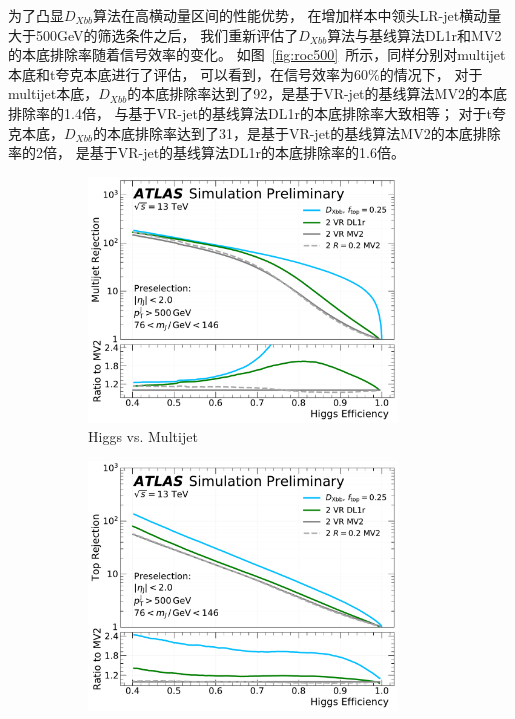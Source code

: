 为了凸显$D_{Xbb}$算法在高横动量区间的性能优势，
在增加样本中领头LR-jet横动量大于500GeV的筛选条件之后，
我们重新评估了$D_{Xbb}$算法与基线算法DL1r和MV2的本底排除率随着信号效率的变化。
如图~\ref{fig:roc500}~所示，同样分别对multijet本底和t夸克本底进行了评估，
可以看到，在信号效率为$60\%$的情况下，
对于multijet本底，$D_{Xbb}$的本底排除率达到了92，是基于VR-jet的基线算法MV2的本底排除率的1.4倍，
与基于VR-jet的基线算法DL1r的本底排除率大致相等；
对于t夸克本底，$D_{Xbb}$的本底排除率达到了31，是基于VR-jet的基线算法MV2的本底排除率的2倍，
是基于VR-jet的基线算法DL1r的本底排除率的1.6倍。


\begin{figure}[!thbp]
  \begin{subfigure}{.5\textwidth}
  \centering
  \includegraphics[width=0.9\textwidth]{figuresXbb/pulled/roc/500_inf/zoom/dijet.pdf}
  \caption{Higgs vs. Multijet}
  \end{subfigure}
  \begin{subfigure}{.5\textwidth}
  \centering
  \includegraphics[width=0.9\textwidth]{figuresXbb/pulled/roc/500_inf/top.pdf}

\end{subfigure}
\end{figure}
